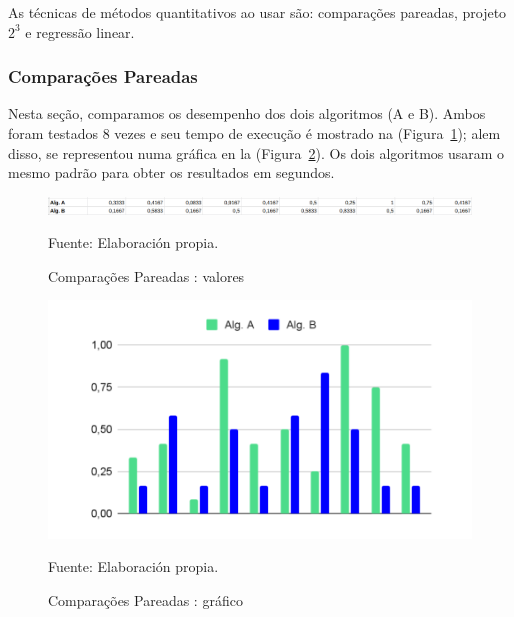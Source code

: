 \documentclass[12pt]{article}
\begin{document}
As técnicas de métodos quantitativos ao usar são: comparações  pareadas, projeto ${2^3}$ e regressão linear.

\subsubsection{Comparações  Pareadas}

Nesta seção, comparamos os desempenho dos dois algoritmos (A e B). Ambos foram testados 8 vezes e seu tempo de execução é mostrado na (Figura~\ref{figure:comparacoes_pareadas_table}); alem disso, se representou numa gráfica en la (Figura~\ref{figure:comparacoes_pareadas_graph}). Os dois algoritmos usaram o mesmo padrão para obter os resultados em segundos.

\begin{figure}[!ht]
	\begin{center}
		\includegraphics[width=1\textwidth]{images/comparacoes_pareadas_table}
	\end{center}
	\begin{center}
		\caption{\label{figure:comparacoes_pareadas_table}
			\small{Comparações  Pareadas : valores}}
		{\small{Fuente: Elaboración propia.}}
	\end{center}
\end{figure}


\begin{figure}[!ht]
	\begin{center}
		\includegraphics[width=1\textwidth]{images/comparacoes_pareadas_graph}
	\end{center}
	\begin{center}
		\vskip -0.5cm
		\caption{\label{figure:comparacoes_pareadas_graph}
			\small{Comparações  Pareadas : gráfico}}
		{\small{Fuente: Elaboración propia.}}
	\end{center}
\end{figure}
\end{document}
